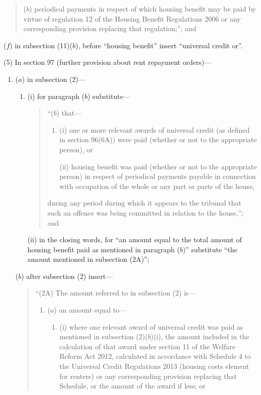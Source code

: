 \documentclass[12pt,a4paper]{article}
\begin{document}
\begin{enumerate}
\begin{enumerate}
\begin{quotation}
\begin{enumerate}
($b$) 
periodical payments in respect of which housing benefit may be paid by virtue of regulation 12 of the Housing Benefit Regulations 2006 or any corresponding provision replacing that regulation;”; and
\end{enumerate}
\end{quotation}
\end{enumerate}

($f$) in subsection (11)($b$), before “housing benefit” insert “universal credit or”.
\end{enumerate}

(5) In section 97 (further provision about rent repayment orders)—
\begin{enumerate}\item[]
($a$) in subsection (2)—
\begin{enumerate}\item[]
(i) for paragraph ($b$)  substitute—
\begin{quotation}
“($b$) that—
\begin{enumerate}\item[]
(i) one or more relevant awards of universal credit (as defined in section 96(6A)) were paid (whether or not to the appropriate person), or

(ii) housing benefit was paid (whether or not to the appropriate person) in respect of periodical payments payable in connection with occupation of the whole or any part or parts of the house,
\end{enumerate}
during any period during which it appears to the tribunal that such an offence was being committed in relation to the house,”; and
\end{quotation}

(ii) in the closing words, for “an amount equal to the total amount of housing benefit paid as mentioned in paragraph ($b$)” substitute “the amount mentioned in subsection (2A)”;
\end{enumerate}

($b$) after subsection (2) insert—
\begin{quotation}
“(2A) The amount referred to in subsection (2) is—
\begin{enumerate}\item[]
($a$) an amount equal to—
\begin{enumerate}\item[]
(i) where one relevant award of universal credit was paid as mentioned in subsection (2)($b$)(i), the amount included in the calculation of that award under section 11 of the Welfare Reform Act 2012, calculated in accordance with Schedule 4 to the Universal Credit Regulations 2013 (housing costs element for renters) or any corresponding provision replacing that Schedule, or the amount of the award if less; or


\end{enumerate}
\end{enumerate}
\end{quotation}
\end{enumerate}
\end{document}
